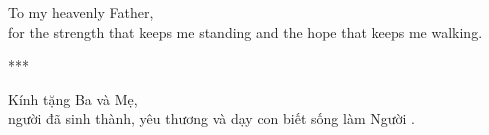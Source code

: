 
\begin{center}
To my heavenly Father,\\for the strength that keeps me standing and the hope that keeps me walking.

\vspace{15pt}
    ***
\vspace{10pt}

\foreignlanguage{vietnamese}{Kính tặng Ba và Mẹ,\\người đã sinh thành, yêu thương và dạy con biết sống làm Người} .
\vspace{30pt}
\end{center}
\hfill
